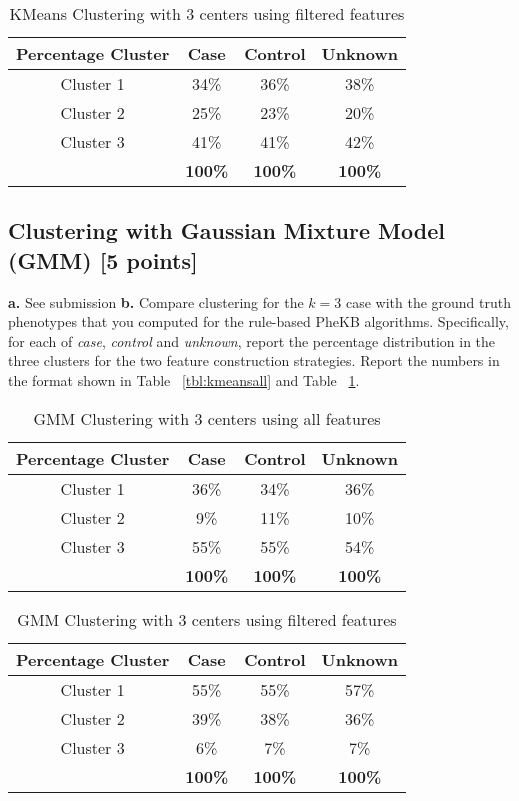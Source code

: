 \documentclass[12pt]{article}
\begin{document}
\begin{table}[!h]
\centering
\begin{tabular}{ c | c | c | c }
  \hline
  Percentage Cluster & Case & Control & Unknown\\
  \hline
  Cluster 1 & 34\% & 36\% & 38\% \\
  Cluster 2 & 25\% & 23\% & 20\% \\
  Cluster 3 & 41\% & 41\% & 42\% \\
  \hline
   & \bf{100\%} & \bf{100\%} & \bf{100\%} \\
  \hline
\end{tabular}
\caption{KMeans Clustering with 3 centers using filtered features}
\label{tbl:kmeansfil}
\end{table}

\subsection{Clustering with Gaussian Mixture Model (GMM) [5 points]}
\textbf{a.} See submission \hfill \break
\textbf{b.} Compare clustering for the $k=3$ case with the ground truth phenotypes that you computed for the rule-based PheKB algorithms. Specifically, for each of \textit{case}, \textit{control} and \textit{unknown}, report the percentage distribution in the three clusters for the two feature construction strategies. Report the numbers in the format shown in Table ~\ref{tbl:kmeansall} and Table ~\ref{tbl:kmeansfil}. \\

\begin{table}[!h]
\centering
\begin{tabular}{ c | c | c | c }
  \hline
  Percentage Cluster & Case & Control & Unknown\\
  \hline
  Cluster 1 & 36\% & 34\% & 36\% \\
  Cluster 2 & 9\% & 11\% & 10\% \\
  Cluster 3 & 55\% & 55\% & 54\% \\
  \hline
   & \bf{100\%} & \bf{100\%} & \bf{100\%} \\
  \hline
\end{tabular}
\caption{GMM Clustering with 3 centers using all features}
\label{tbl:gmmall}
\end{table}

\begin{table}[!h]
\centering
\begin{tabular}{ c | c | c | c }
  \hline
  Percentage Cluster & Case & Control & Unknown\\
  \hline
  Cluster 1 & 55\% & 55\% & 57\% \\
  Cluster 2 & 39\% & 38\% & 36\% \\
  Cluster 3 & 6\% & 7\% & 7\% \\
  \hline
   & \bf{100\%} & \bf{100\%} & \bf{100\%} \\
  \hline
\end{tabular}
\caption{GMM Clustering with 3 centers using filtered features}
\label{tbl:gmmfil}
\end{table}
\end{document}
